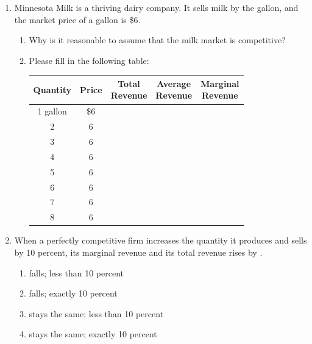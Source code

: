 \documentclass{article}
\begin{document}
\begin{enumerate}
\begin{enumerate}
	\end{enumerate}
	
\item Minnesota Milk is a thriving dairy company. It sells milk by the gallon, and the market price of a gallon is \$6.
	
	\begin{enumerate}
		
	\item Why is it reasonable to assume that the milk market is competitive?
	
	\item Please fill in the following table:
	
		\begin{center}
		\begin{tabular}{c | c | c | c | c }
		Quantity & Price & \makecell{Total\\Revenue} & \makecell{Average\\Revenue} & \makecell{Marginal\\Revenue} \\
		\hline
		1 gallon & \$6 & & & \\
		\hline
		2 & 6 & & & \\
		\hline
		3 & 6 & & & \\
		\hline
		4 & 6 & & & \\
		\hline
		5 & 6 & & & \\
		\hline
		6 & 6 & & & \\
		\hline
		7 & 6 & & & \\
		\hline
		8 & 6 & & &
		\end{tabular}
		\end{center}
			
	\end{enumerate}
		
\item When a perfectly competitive firm increases the quantity it produces and sells by 10 percent, its marginal revenue \underline{\phantom{xxxxxxxxxx}} and its total revenue rises by \underline{\phantom{xxxxxxxxxx}}.
	
	\begin{enumerate}
		
	\item falls; less than 10 percent
		
	\item falls; exactly 10 percent
		
	\item stays the same; less than 10 percent
		
	\item stays the same; exactly 10 percent
		
	\end{enumerate}

\end{enumerate}
\end{document}
